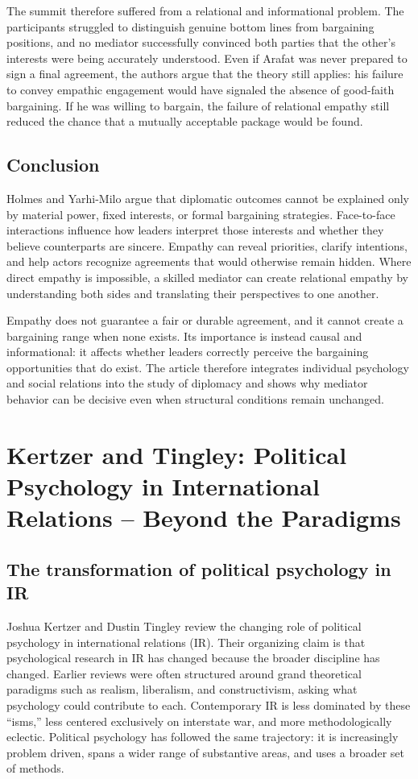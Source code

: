 The summit therefore suffered from a relational and informational problem. The participants struggled to distinguish genuine bottom lines from bargaining positions, and no mediator successfully convinced both parties that the other's interests were being accurately understood. Even if Arafat was never prepared to sign a final agreement, the authors argue that the theory still applies: his failure to convey empathic engagement would have signaled the absence of good-faith bargaining. If he was willing to bargain, the failure of relational empathy still reduced the chance that a mutually acceptable package would be found.

\subsection{Conclusion}

Holmes and Yarhi-Milo argue that diplomatic outcomes cannot be explained only by material power, fixed interests, or formal bargaining strategies. Face-to-face interactions influence how leaders interpret those interests and whether they believe counterparts are sincere. Empathy can reveal priorities, clarify intentions, and help actors recognize agreements that would otherwise remain hidden. Where direct empathy is impossible, a skilled mediator can create relational empathy by understanding both sides and translating their perspectives to one another.

Empathy does not guarantee a fair or durable agreement, and it cannot create a bargaining range when none exists. Its importance is instead causal and informational: it affects whether leaders correctly perceive the bargaining opportunities that do exist. The article therefore integrates individual psychology and social relations into the study of diplomacy and shows why mediator behavior can be decisive even when structural conditions remain unchanged.

\section{Kertzer and Tingley: Political Psychology in International Relations -- Beyond the Paradigms}

\subsection{The transformation of political psychology in IR}

Joshua Kertzer and Dustin Tingley review the changing role of political psychology in international relations (IR). Their organizing claim is that psychological research in IR has changed because the broader discipline has changed. Earlier reviews were often structured around grand theoretical paradigms such as realism, liberalism, and constructivism, asking what psychology could contribute to each. Contemporary IR is less dominated by these ``isms,'' less centered exclusively on interstate war, and more methodologically eclectic. Political psychology has followed the same trajectory: it is increasingly problem driven, spans a wider range of substantive areas, and uses a broader set of methods.


